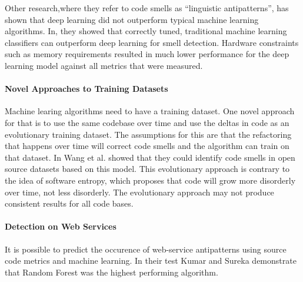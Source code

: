 \documentclass[conference]{IEEEtran}
\begin{document}
Other research\cite{fakhoury_keep_2018},where they refer to code smells as ``linguistic antipatterns'', has shown that deep learning did not outperform typical machine learning algorithms. In\cite{fakhoury_keep_2018}, they showed that correctly tuned, traditional machine learning classifiers can outperform deep learning for smell detection. Hardware constraints such as memory requirements resulted in much lower performance for the deep learning model against all metrics that were measured. 

\paragraph{Novel Approaches to Training Datasets}
Machine learing algorithms need to have a training dataset. One novel approach for that is to use the same codebase over time and use the deltas in code as an evolutionary training dataset\cite{wang_using_2018}. The assumptions for this are that the refactoring that happens over time will correct code smells and the algorithm can train on that dataset. In\cite{wang_using_2018} Wang et al. showed that they could identify code smells in open source datasets based on this model.
This evolutionary approach is contrary to the idea of software entropy\cite{gupta_software_2018}, which proposes that code will grow more disorderly over time, not less disorderly. The evolutionary approach may not produce consistent results for all code bases.

\paragraph{Detection on Web Services}
It is possible to predict the occurence of web-service antipatterns using source code metrics and machine learning\cite{kumar_empirical_2018}. In their test Kumar and Sureka demonstrate that Random Forest was the highest performing algorithm.
\end{document}
